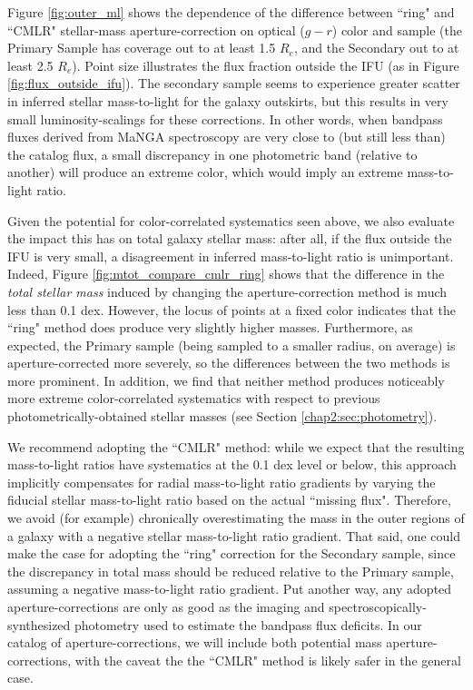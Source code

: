 Figure \ref{fig:outer_ml} shows the dependence of the difference between ``ring" and ``CMLR" stellar-mass aperture-correction on optical ($g-r$) color and sample (the Primary Sample has coverage out to at least 1.5 $R_e$, and the Secondary out to at least 2.5 $R_e$). Point size illustrates the flux fraction outside the IFU (as in Figure \ref{fig:flux_outside_ifu}). The secondary sample seems to experience greater scatter in inferred stellar mass-to-light for the galaxy outskirts, but this results in very small luminosity-scalings for these corrections. In other words, when bandpass fluxes derived from MaNGA spectroscopy are very close to (but still less than) the catalog flux, a small discrepancy in one photometric band (relative to another) will produce an extreme color, which would imply an extreme mass-to-light ratio.

Given the potential for color-correlated systematics seen above, we also evaluate the impact this has on total galaxy stellar mass: after all, if the flux outside the IFU is very small, a disagreement in inferred mass-to-light ratio is unimportant. Indeed, Figure \ref{fig:mtot_compare_cmlr_ring} shows that the difference in the \emph{total stellar mass} induced by changing the aperture-correction method is much less than 0.1 dex. However, the locus of points at a fixed color indicates that the ``ring" method does produce very slightly higher masses. Furthermore, as expected, the Primary sample (being sampled to a smaller radius, on average) is aperture-corrected more severely, so the differences between the two methods is more prominent. In addition, we find that neither method produces noticeably more extreme color-correlated systematics with respect to previous photometrically-obtained stellar masses (see Section \ref{chap2:sec:photometry}). 

We recommend adopting the ``CMLR" method: while we expect that the resulting mass-to-light ratios have systematics at the 0.1 dex level or below, this approach implicitly compensates for radial mass-to-light ratio gradients \citep{tortora_napolitano_10_spgrad, tortora_napolitano_11, boardman_weijmans_vdB_17} by varying the fiducial stellar mass-to-light ratio based on the actual ``missing flux". Therefore, we avoid (for example) chronically overestimating the mass in the outer regions of a galaxy with a negative stellar mass-to-light ratio gradient. That said, one could make the case for adopting the ``ring" correction for the Secondary sample, since the discrepancy in total mass should be reduced relative to the Primary sample, assuming a negative mass-to-light ratio gradient. Put another way, any adopted aperture-corrections are only as good as the imaging and spectroscopically-synthesized photometry used to estimate the bandpass flux deficits. In our catalog of aperture-corrections, we will include both potential mass aperture-corrections, with the caveat the the ``CMLR" method is likely safer in the general case.

